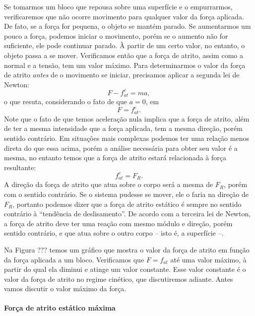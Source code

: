 Se tomarmos um bloco que repousa sobre uma superfície e o empurrarmos, verificaremos que não ocorre movimento para qualquer valor da força aplicada. De fato, se a força for pequena, o objeto se mantém parado. Se aumentarmos um pouco a força, podemos iniciar o movimento, porém se o aumento não for suficiente, ele pode continuar parado. À partir de um certo valor, no entanto, o objeto passa a se mover. Verificamos então que a força de atrito, assim como a normal e a tensão, tem um valor máximo. Para determinarmos o valor da força de atrito \emph{antes} de o movimento se iniciar, precisamos aplicar a segunda lei de Newton:
\begin{equation}
  F - f_{at}^e = ma,
\end{equation}
%
o que resuta, considerando o fato de que $a = 0$, em
\begin{equation}
  F = f_{at}^e.
\end{equation}
%
Note que o fato de que temos aceleração nula implica que a força de atrito, além de ter a mesma intensidade que a força aplicada, tem a mesma direção, porém sentido contrário. Em situações mais complexas podemos ter uma relação menos direta do que essa acima, porém a análise necessária para obter seu valor é a mesma, no entanto temos que a força de atrito estará relacionada à força resultante:
\begin{equation}
  f_{at}^e = F_R.
\end{equation}
%
A direção da força de atrito que atua sobre o corpo será a mesma de $F_R$, porém com o sentido contrário. Se o sistema pudesse se mover, ele o faria na direção de $F_R$, portanto podemos dizer que a força de atrito estático é sempre no sentido contrário à ``tendência de deslisamento''. De acordo com a terceira lei de Newton, a força de atrito deve ter uma reação com mesmo módulo e direção, porém sentido contrário, e que atua sobre o outro corpo -- isto é, a superfície --.

Na Figura ??? temos um gráfico que mostra o valor da força de atrito em função da força aplicada a um bloco. Verificamos que $F = f_{at}$ até uma valor máximo, à partir do qual ela diminui e atinge um valor constante. Esse valor constante é o valor da força de atrito no regime cinético, que discutiremos adiante. Antes vamos discutir o valor máximo da força.

\paragraph{Força de atrito estático máxima} 


